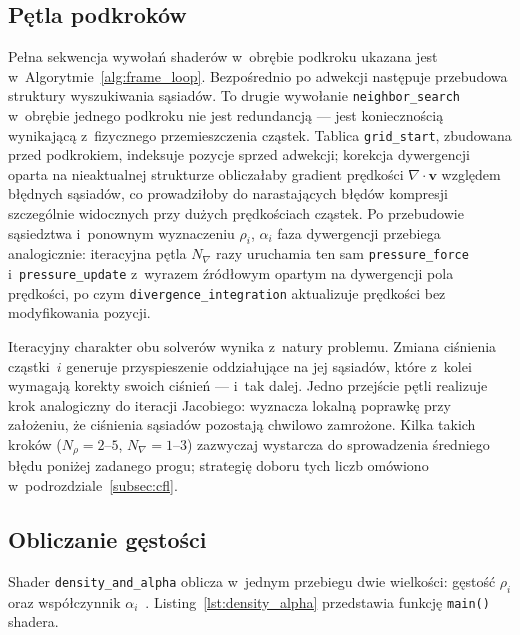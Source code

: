 \subsection{Pętla podkroków}
\label{subsec:substep_loop}

Pełna sekwencja wywołań shaderów w~obrębie podkroku ukazana jest
w~Algorytmie~\ref{alg:frame_loop}.
Bezpośrednio po adwekcji następuje przebudowa struktury wyszukiwania
sąsiadów. To drugie wywołanie \texttt{neighbor\_search} w~obrębie jednego
podkroku nie jest redundancją --- jest koniecznością wynikającą z~fizycznego
przemieszczenia cząstek.
Tablica \texttt{grid\_start}, zbudowana przed podkrokiem, indeksuje pozycje
sprzed adwekcji; korekcja dywergencji oparta na nieaktualnej strukturze
obliczałaby gradient prędkości $\nabla \cdot \mathbf{v}$ względem błędnych
sąsiadów, co prowadziłoby do narastających błędów kompresji szczególnie
widocznych przy dużych prędkościach cząstek.
Po przebudowie sąsiedztwa i~ponownym wyznaczeniu $\rho_i$, $\alpha_i$
faza dywergencji przebiega analogicznie: iteracyjna pętla $N_\nabla$ razy
uruchamia ten sam \texttt{pressure\_force} i~\texttt{pressure\_update}
z~wyrazem źródłowym opartym na dywergencji pola prędkości,
po czym \texttt{divergence\_integration} aktualizuje prędkości
bez modyfikowania pozycji.

Iteracyjny charakter obu solverów wynika z~natury problemu.
Zmiana ciśnienia cząstki~$i$ generuje przyspieszenie oddziałujące na
jej sąsiadów, które z~kolei wymagają korekty swoich ciśnień ---
i~tak dalej.
Jedno przejście pętli realizuje krok analogiczny do iteracji Jacobiego:
wyznacza lokalną poprawkę przy założeniu, że ciśnienia sąsiadów pozostają
chwilowo zamrożone.
Kilka takich kroków ($N_\rho = 2$--$5$, $N_\nabla = 1$--$3$)
zazwyczaj wystarcza do sprowadzenia średniego błędu poniżej zadanego progu;
strategię doboru tych liczb omówiono w~podrozdziale~\ref{subsec:cfl}.

\subsection{Obliczanie gęstości}
\label{subsec:density}

Shader \texttt{density\_and\_alpha} oblicza w~jednym przebiegu dwie
wielkości: gęstość $\rho_i$ oraz współczynnik $\alpha_i$~\cite{bender2015divergence}.
Listing~\ref{lst:density_alpha} przedstawia funkcję \texttt{main()} shadera.

